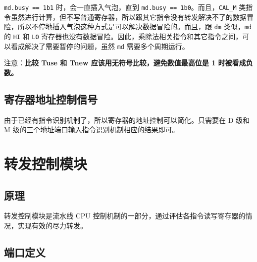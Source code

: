 \documentclass[12pt,AutoFakeBold,AutoFakeSlant]{article}
\begin{document}
\texttt{md.busy\ ==\ 1\textquotesingle{}b1} 时，会一直插入气泡，直到
\texttt{md.busy\ ==\ 1\textquotesingle{}b0}。而且，\texttt{CAL\_M}
类指令虽然进行计算，但不写普通寄存器，所以跟其它指令没有转发解决不了的数据冒险，所以不停地插入气泡这种方式是可以解决数据冒险的。而且，跟
\texttt{dm} 类似，\texttt{md} 的 \texttt{HI} 和 \texttt{LO}
寄存器也没有数据冒险。因此，乘除法相关指令和其它指令之间，可以看成解决了需要暂停的问题，虽然
\texttt{md} 需要多个周期运行。

注意：\textbf{比较 Tuse 和 Tnew 应该用无符号比较，避免数值最高位是 1
时被看成负数。}

\hypertarget{ux5bc4ux5b58ux5668ux5730ux5740ux63a7ux5236ux4fe1ux53f7}{%
\subsection{寄存器地址控制信号}\label{ux5bc4ux5b58ux5668ux5730ux5740ux63a7ux5236ux4fe1ux53f7}}

由于已经有指令识别机制了，所以寄存器的地址控制可以简化。只需要在 D 级和 M 级的三个地址端口输入指令识别机制相应的结果即可。

\section{转发控制模块}

\subsection{原理}

转发控制模块是流水线 CPU 控制机制的一部分，通过评估各指令读写寄存器的情况，实现有效的尽力转发。

\subsection{端口定义}
\end{document}
